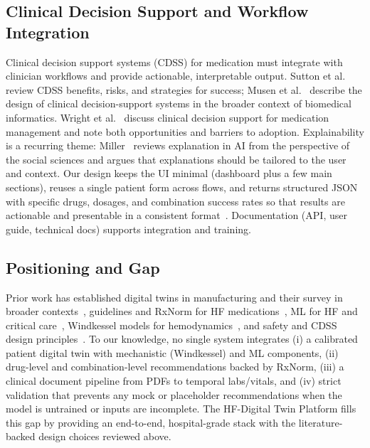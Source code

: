 \documentclass[conference]{IEEEtran}
\begin{document}
\subsection{Clinical Decision Support and Workflow Integration}
Clinical decision support systems (CDSS) for medication must integrate with clinician workflows and provide actionable, interpretable output. Sutton et al.~\cite{sutton2020cdss} review CDSS benefits, risks, and strategies for success; Musen et al.~\cite{musen2014cdss} describe the design of clinical decision-support systems in the broader context of biomedical informatics. Wright et al.~\cite{wright2015medrec} discuss clinical decision support for medication management and note both opportunities and barriers to adoption. Explainability is a recurring theme: Miller~\cite{miller2018explanation} reviews explanation in AI from the perspective of the social sciences and argues that explanations should be tailored to the user and context. Our design keeps the UI minimal (dashboard plus a few main sections), reuses a single patient form across flows, and returns structured JSON with specific drugs, dosages, and combination success rates so that results are actionable and presentable in a consistent format~\cite{sutton2020cdss,wright2015medrec}. Documentation (API, user guide, technical docs) supports integration and training.

\subsection{Positioning and Gap}
Prior work has established digital twins in manufacturing and their survey in broader contexts~\cite{grieves2014digital,barricelli2019digital}, guidelines and RxNorm for HF medications~\cite{heidenreich2022aha,nelson2002rxnorm}, ML for HF and critical care~\cite{chicco2020uci,komorowski2018ai,johnson2016mimic}, Windkessel models for hemodynamics~\cite{westerhof2009arterial}, and safety and CDSS design principles~\cite{ghassemi2021practical,sutton2020cdss}. To our knowledge, no single system integrates (i) a calibrated patient digital twin with mechanistic (Windkessel) and ML components, (ii) drug-level and combination-level recommendations backed by RxNorm, (iii) a clinical document pipeline from PDFs to temporal labs/vitals, and (iv) strict validation that prevents any mock or placeholder recommendations when the model is untrained or inputs are incomplete. The HF-Digital Twin Platform fills this gap by providing an end-to-end, hospital-grade stack with the literature-backed design choices reviewed above.
\end{document}
